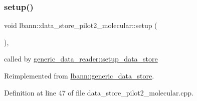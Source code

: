 \subsubsection{\texorpdfstring{setup()}{setup()}}
{\footnotesize\ttfamily void lbann\+::data\+\_\+store\+\_\+pilot2\+\_\+molecular\+::setup (\begin{DoxyParamCaption}{ }\end{DoxyParamCaption})\hspace{0.3cm}{\ttfamily [override]}, {\ttfamily [virtual]}}



called by \hyperlink{classlbann_1_1generic__data__reader_a8b2a09d38512fc11f1b9d572c89100a7}{generic\+\_\+data\+\_\+reader\+::setup\+\_\+data\+\_\+store} 



Reimplemented from \hyperlink{classlbann_1_1generic__data__store_a1cff17def02ee21b6ca0befeb04bb582}{lbann\+::generic\+\_\+data\+\_\+store}.



Definition at line 47 of file data\+\_\+store\+\_\+pilot2\+\_\+molecular.\+cpp.


